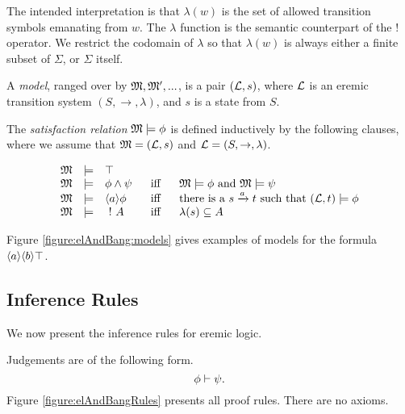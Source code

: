 \NI The intended interpretation is that $\lambda(w)$ is the set of allowed
transition symbols emanating from $w$.  The $\lambda$ function is the
semantic counterpart of the $!$ operator.
We restrict the codomain of $\lambda$ so that $\lambda(w)$ is always either a finite subset of $\Sigma$, or $\Sigma$ itself.

\begin{definition}
A \emph{model}, ranged over by $\frak{M}, \frak{M}', ...$, is a pair $(\mathcal{L},
s)$, where $\mathcal{L}$ is an eremic transition system $(S, \rightarrow,
\lambda)$, and $s$ is a state from $S$.
\end{definition}



\begin{definition}
The \emph{satisfaction relation} $\frak{M} \models \phi$ is defined
inductively by the following clauses, where we assume that $\frak{M} =
(\mathcal{L}, s)$ and $\mathcal{L} = (S, \rightarrow, \lambda)$.

\[
\begin{array}{lclcl}
  \frak{M} & \models & \top   \\
  \frak{M} & \models & \phi \land \psi &\ \mbox{ iff } \ & \frak{M}  \models \phi \mbox { and } \frak{M} \models \psi  \\
  \frak{M} & \models & \langle a \rangle \phi & \mbox{ iff } & \text{there is a } s \xrightarrow{a} t \mbox { such that } (\mathcal{L}, t) \models \phi  \\
  \frak{M} & \models & \ ! \  A &\mbox{ iff } & \lambda(s) \subseteq A
\end{array}
\]

\end{definition}

\NI Figure \ref{figure:elAndBang:models} gives examples of models for
the formula $\langle a \rangle \langle b \rangle \top$. 

\subsection{Inference Rules}



\NI We now present the inference rules for eremic logic. 

\begin{definition} Judgements are of the following form.
\[
  \phi \vdash \psi.
\]
Figure \ref{figure:elAndBangRules} presents all proof rules. There are
no axioms.
\end{definition}

